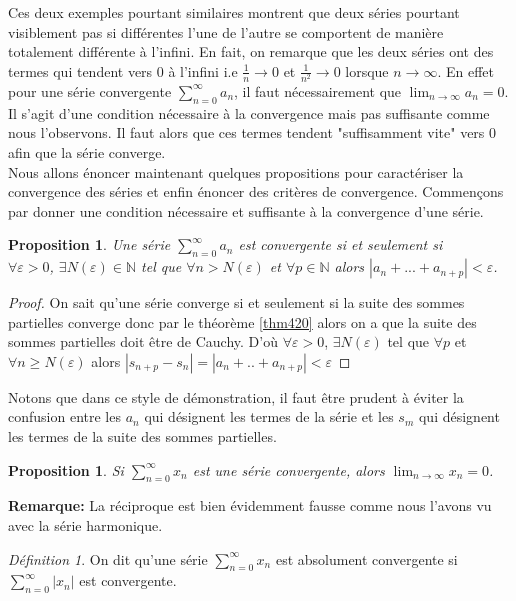\documentclass[oneside,12pt,french,table]{book}
\theoremstyle{definition}
\theoremstyle{plain}
\newtheorem{proposition}[definition]{Proposition}
\theoremstyle{remark}
\newtheorem{defi}[definition]{Définition}
\newcommand{\Nn}{{\mathbb{N}}}
\begin{document}
Ces deux exemples pourtant similaires montrent que deux séries pourtant visiblement pas si différentes l'une de l'autre se comportent de manière totalement différente à l'infini. En fait, on remarque que les deux séries ont des termes qui tendent vers 0 à l'infini i.e $\frac{1}{n} \rightarrow 0$ et $\frac{1}{n^2} \rightarrow 0$ lorsque $n \rightarrow \infty$. En effet pour une série convergente $\sum_{n=0}^{\infty} a_n$, il faut nécessairement que $\lim_{n\to \infty} a_n = 0$. Il s'agit d'une condition nécessaire à la convergence mais pas suffisante comme nous l'observons. Il faut alors que ces termes tendent "suffisamment vite" vers 0 afin que la série converge. 
\newline
\\Nous allons énoncer maintenant quelques propositions pour caractériser la convergence des séries et enfin énoncer des critères de convergence.
Commençons par donner une condition nécessaire et suffisante à la convergence d'une série.
\begin{proposition}
    Une série $\sum_{n = 0}^{\infty} a_n$ est convergente si et seulement si 
    \\\quad $ \forall \varepsilon > 0$, $\exists N(\varepsilon) \in \Nn $ tel que $\forall n > N(\varepsilon)$ et $\forall p \in \Nn $ alors $|a_n + ... + a_{n+p}| < \varepsilon$. 
\end{proposition}
\begin{proof}
   On sait qu'une série converge si et seulement si la suite des sommes partielles converge donc par le théorème \ref{thm420} alors on a que la suite des sommes partielles doit être de Cauchy. D'où $\forall \varepsilon >0 $, $\exists N(\varepsilon)$ tel que $\forall p$ et $\forall n \ge N(\varepsilon)$ alors $|s_{n+p} - s_n| = | a_n + .. + a_{n+p}| < \varepsilon$ 
\end{proof}
Notons que dans ce style de démonstration, il faut être prudent à éviter la confusion entre les $a_n$ qui désignent les termes de la série et les $s_m$ qui désignent les termes de la suite des sommes partielles. 

\begin{proposition}
    Si $\sum_{n=0}^{\infty} x_n$ est une série convergente, alors $\lim_{n\rightarrow\infty}x_n=0$.
\end{proposition} 
\textbf{Remarque: }La réciproque est bien évidemment fausse comme nous l'avons vu avec la série harmonique. 
\begin{defi}
    On dit qu'une série $\sum_{n=0}^{\infty} x_n$ est absolument convergente si $\sum_{n=0}^{\infty} |x_n|$ est convergente.
\end{defi}
\end{document}
